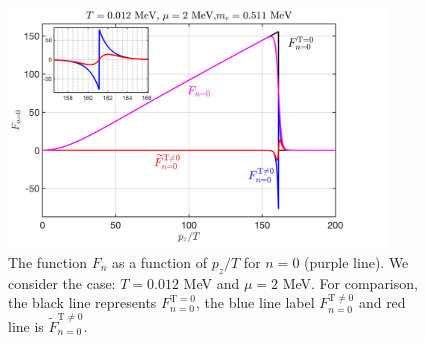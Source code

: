\documentclass[sn-mathphys,Numbered]{sn-jnl}
\begin{document}
\begin{figure}[ht]
\begin{center}
\includegraphics[width=0.9\textwidth]{./plot/NewFermi_Background}
\caption{The function $F_n$ as a function of $p_z/T$ for $n=0$ (purple line). We consider the case: $T=0.012$ MeV and $\mu=2$ MeV. For comparison, the black line represents $F_{n=0}^{\mathrm{T=0}}$, the blue line label $F_{n=0}^{\mathrm{T\neq0}}$ and red line is $\tilde F_{n=0}^{\mathrm{T\neq0}}$.}
\label{F0_Checking}
\end{center}
\end{figure}
\end{document}
